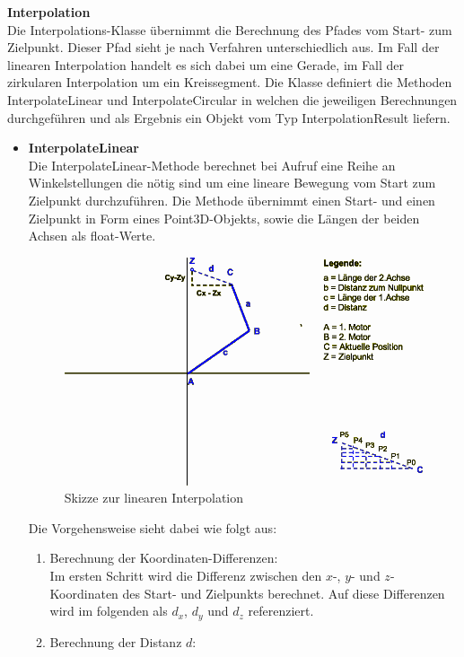\textbf{Interpolation}\\
Die Interpolations-Klasse übernimmt die Berechnung des Pfades vom Start- zum Zielpunkt. Dieser Pfad sieht je nach Verfahren unterschiedlich aus. Im Fall der linearen Interpolation handelt es sich dabei um eine Gerade, im Fall der zirkularen Interpolation um ein Kreissegment. Die Klasse definiert die Methoden InterpolateLinear und InterpolateCircular in welchen die jeweiligen Berechnungen durchgeführen und als Ergebnis ein Objekt vom Typ InterpolationResult liefern.
\begin{itemize}
\item \textbf{InterpolateLinear}\\
Die InterpolateLinear-Methode berechnet bei Aufruf eine Reihe an Winkelstellungen die nötig sind um eine lineare Bewegung vom Start zum Zielpunkt durchzuführen. Die Methode übernimmt einen Start- und einen Zielpunkt in Form eines Point3D-Objekts, sowie die Längen der beiden Achsen als float-Werte.\\
\begin{figure}[H]
  \centering
  \begin{minipage}[t]{14 cm}
  	\centering
  	\includegraphics[width=12cm]{images/Linearinterpolation} 
    \caption{Skizze zur linearen Interpolation}
  \end{minipage}
\end{figure}
Die Vorgehensweise sieht dabei wie folgt aus:
\begin{enumerate}
\item Berechnung der Koordinaten-Differenzen:\\
Im ersten Schritt wird die Differenz zwischen den $x$-, $y$- und $z$-Koordinaten des Start- und Zielpunkts berechnet. Auf diese Differenzen wird im folgenden als $d_x$, $d_y$ und $d_z$ referenziert. 
\item Berechnung der Distanz $d$:\\

\end{enumerate}
\end{itemize}
